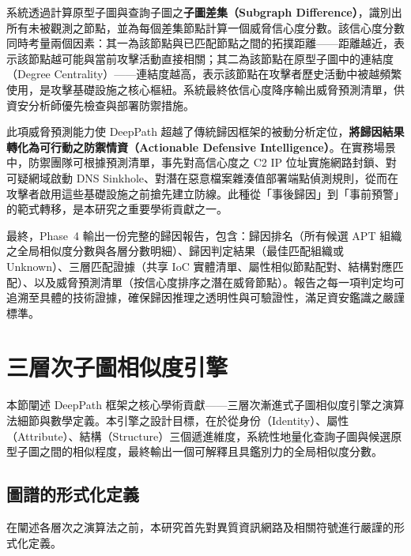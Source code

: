 \begin{ZhChapter}
系統透過計算原型子圖與查詢子圖之\textbf{子圖差集（Subgraph Difference）}，識別出所有未被觀測之節點，並為每個差集節點計算一個威脅信心度分數。該信心度分數同時考量兩個因素：其一為該節點與已匹配節點之間的拓撲距離——距離越近，表示該節點越可能與當前攻擊活動直接相關；其二為該節點在原型子圖中的連結度（Degree Centrality）——連結度越高，表示該節點在攻擊者歷史活動中被越頻繁使用，是攻擊基礎設施之核心樞紐。系統最終依信心度降序輸出威脅預測清單，供資安分析師優先檢查與部署防禦措施。

此項威脅預測能力使 DeepPath 超越了傳統歸因框架的被動分析定位，\textbf{將歸因結果轉化為可行動之防禦情資（Actionable Defensive Intelligence）}。在實務場景中，防禦團隊可根據預測清單，事先對高信心度之 C2 IP 位址實施網路封鎖、對可疑網域啟動 DNS Sinkhole、對潛在惡意檔案雜湊值部署端點偵測規則，從而在攻擊者啟用這些基礎設施之前搶先建立防線。此種從「事後歸因」到「事前預警」的範式轉移，是本研究之重要學術貢獻之一。

最終，Phase~4 輸出一份完整的歸因報告，包含：歸因排名（所有候選 APT 組織之全局相似度分數與各層分數明細）、歸因判定結果（最佳匹配組織或 Unknown）、三層匹配證據（共享 IoC 實體清單、屬性相似節點配對、結構對應匹配）、以及威脅預測清單（按信心度排序之潛在威脅節點）。報告之每一項判定均可追溯至具體的技術證據，確保歸因推理之透明性與可驗證性，滿足資安鑑識之嚴謹標準。


\section{三層次子圖相似度引擎}
\label{sec:similarity-engine}

本節闡述 DeepPath 框架之核心學術貢獻——三層次漸進式子圖相似度引擎之演算法細節與數學定義。本引擎之設計目標，在於從身份（Identity）、屬性（Attribute）、結構（Structure）三個遞進維度，系統性地量化查詢子圖與候選原型子圖之間的相似程度，最終輸出一個可解釋且具鑑別力的全局相似度分數。

\subsection{圖譜的形式化定義}
\label{subsec:graph-formal}

在闡述各層次之演算法之前，本研究首先對異質資訊網路及相關符號進行嚴謹的形式化定義。


\end{ZhChapter}
